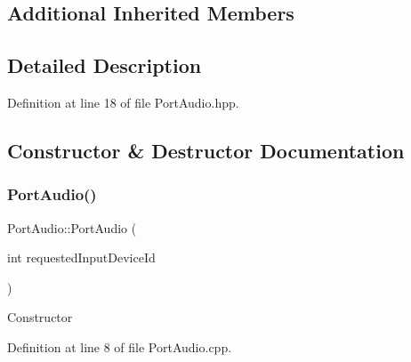 \subsection*{Additional Inherited Members}


\subsection{Detailed Description}


Definition at line 18 of file Port\+Audio.\+hpp.



\subsection{Constructor \& Destructor Documentation}
\mbox{\label{classPortAudio_ae2b322ab89b7412a1bc61a4b02a20bf0}} 
\subsubsection{\texorpdfstring{Port\+Audio()}{PortAudio()}\hspace{0.1cm}{\footnotesize\ttfamily [1/2]}}
{\footnotesize\ttfamily Port\+Audio\+::\+Port\+Audio (\begin{DoxyParamCaption}\item[{int}]{requested\+Input\+Device\+Id }\end{DoxyParamCaption})}

Constructor 

Definition at line 8 of file Port\+Audio.\+cpp.


